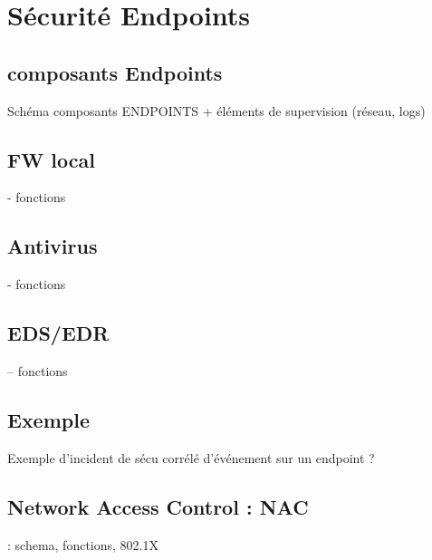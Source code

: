 

\section{Sécurité Endpoints}
\subsection{composants Endpoints}
Schéma composants ENDPOINTS + éléments de supervision (réseau, logs)
\subsection{FW local}
- fonctions
\subsection{Antivirus}
- fonctions
\subsection{EDS/EDR}
– fonctions
\subsection{Exemple}
Exemple d’incident de sécu corrélé d’événement sur un endpoint ?

\subsection{Network Access Control : NAC}
: schema, fonctions, 802.1X 










